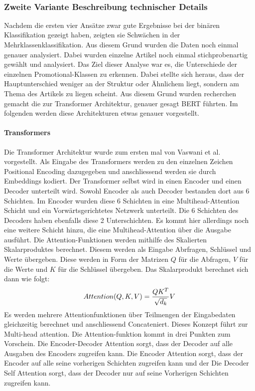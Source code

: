 \

\subsubsection{Zweite Variante Beschreibung technischer Details}
Nachdem die ersten vier Ansätze zwar gute Ergebnisse bei der binären Klassifikation gezeigt haben, zeigten sie Schwächen in der Mehrklassenklassifikation. Aus diesem Grund wurden die Daten noch einmal genauer analysiert. Dabei wurden einzelne Artikel noch einmal stichprobenartig gewählt und analysiert. Das Ziel dieser Analyse war es, die Unterschiede der einzelnen Promotional-Klassen zu erkennen. Dabei stellte sich heraus, dass der Hauptunterschied weniger an der Struktur oder Ähnlichem liegt, sondern am Thema des Artikels zu liegen scheint. Aus diesem Grund wurden recherchen gemacht die zur Transformer Architektur, genauer gesagt BERT führten. Im folgenden werden diese Architekturen etwas genauer vorgestellt.
\paragraph{Transformers}
Die Transformer Architektur wurde zum ersten mal von Vaswani et al. \cite{Attention} vorgestellt. Als Eingabe des Transformers werden zu den einzelnen Zeichen Positional Encoding dazugegeben und anschliessend werden sie durch Embeddings kodiert. Der Transformer selbst wird in einen Encoder und einen Decoder unterteilt wird. Sowohl Encoder als auch Decoder bestanden dort aus 6 Schichten. Im Encoder wurden diese 6 Schichten in eine Multihead-Attention Schicht und ein Vorwärtsgerichtetes Netzwerk unterteilt. Die 6 Schichten des Decoders haben ebenfalls diese 2 Unterschichten. Es kommt hier allerdings noch eine weitere Schicht hinzu, die eine Multihead-Attention über die Ausgabe ausführt. Die Attention-Funktionen werden mithilfe des Skalierten Skalarproduktes berechnet. Diesem werden als Eingabe Abrfragen, Schlüssel und Werte übergeben. Diese werden in Form der Matrizen $Q$ für die Abfragen, $V$ für die Werte und $K$ für die Schlüssel übergeben. Das Skalarprodukt berechnet sich dann wie folgt:
$${Attention(Q,K,V)} = {{{QK^T} \over \sqrt{d_k}} V}$$
Es werden mehrere Attentionfunktionen über Teilmengen der Eingabedaten gleichzeitig berechnet und anschliessend Concateniert. Dieses Konzept führt zur Multi-head attention. Die Attention-funktion kommt in drei Punkten zum Vorschein. Die Encoder-Decoder Attention sorgt, dass der Decoder auf alle Ausgaben des Encoders zugreifen kann. Die Encoder Attention sorgt, dass der Encoder auf alle seine vorherigen Schichten zugreifen kann und der Die Decoder Self Attention sorgt, dass der Decoder nur auf seine Vorherigen Schichten zugreifen kann. 
